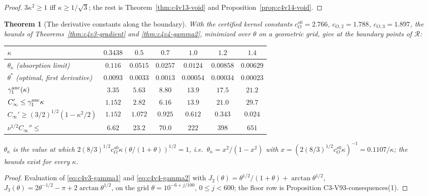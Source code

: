 \documentclass[11pt]{article}
\theoremstyle{plain}
\newtheorem{theorem}{Theorem}[section]
\theoremstyle{definition}
\theoremstyle{remark}
\begin{document}
\begin{proof}
\(3\kappa^2\ge1\) iff \(\kappa\ge1/\sqrt3\); the rest is Theorem~\ref{thm:c4v13-void} and
Proposition~\ref{prop:c4v14-void}.
\end{proof}

\begin{theorem}[The derivative constants along the boundary]
\label{thm:c4v21-table}
With the certified kernel constants \(c_O^{s0}=2.766\), \(c_{O,2}=1.788\), \(c_{O,3}=1.897\), the
bounds of Theorems~\ref{thm:c4v3-gradient} and \ref{thm:c4v4-gamma2},
minimized over \(\theta\) on a geometric grid, give at the boundary
points of \(\mathcal R\):

\medskip
\begin{center}\small
\begin{tabular}{@{}lcccccc@{}}
\toprule
\(\kappa\) & \(0.3438\) & \(0.5\) & \(0.7\) & \(1.0\) & \(1.2\) & \(1.4\)\\
\midrule
\(\theta_\kappa\) (absorption limit) & \(0.116\) & \(0.0515\) & \(0.0257\) & \(0.0124\) & \(0.00858\) & \(0.00629\)\\
\(\theta^*\) (optimal, first derivative) & \(0.0093\) & \(0.0033\) & \(0.0013\) & \(0.00054\) & \(0.00034\) & \(0.00023\)\\
\(\gamma_1^{\rm anc}(\kappa)\) & \(3.35\) & \(5.63\) & \(8.80\) & \(13.9\) & \(17.5\) & \(21.2\)\\
\(C_\infty'\le\gamma_1^{\rm anc}\kappa\) & \(1.152\) & \(2.82\) & \(6.16\) & \(13.9\) & \(21.0\) & \(29.7\)\\
\(C_\infty'\ge(3/2)^{1/2}(1-\kappa^2/2)\) & \(1.152\) & \(1.072\) & \(0.925\) & \(0.612\) & \(0.343\) & \(0.024\)\\
\(\nu^{1/2}C_\infty''\le\) & \(6.62\) & \(23.2\) & \(70.0\) & \(222\) & \(398\) & \(651\)\\
\bottomrule
\end{tabular}
\end{center}
\medskip

\noindent
\(\theta_\kappa\) is the value at which \(2(8/3)^{1/2}c_O^{s0}\kappa(\theta/(1+\theta))^{1/2}=1\), i.e.\ \(\theta_\kappa=x^2/(1-x^2)\)
with \(x=(2(8/3)^{1/2}c_O^{s0}\kappa)^{-1}=0.1107/\kappa\); the bounds exist for every \(\kappa\).
\end{theorem}

\begin{proof}
Evaluation of \eqref{eq:c4v3-gamma1} and \eqref{eq:c4v4-gamma2} with
\(J_2(\theta)=\theta^{1/2}/(1+\theta)+\arctan\theta^{1/2}\), \(J_3(\theta)=2\theta^{-1/2}-\pi+2\arctan\theta^{1/2}\), on the grid
\(\theta=10^{-6+j/100}\), \(0\le j<600\); the floor row is Proposition
C3-V93-consequences(1).
\end{proof}
\end{document}
